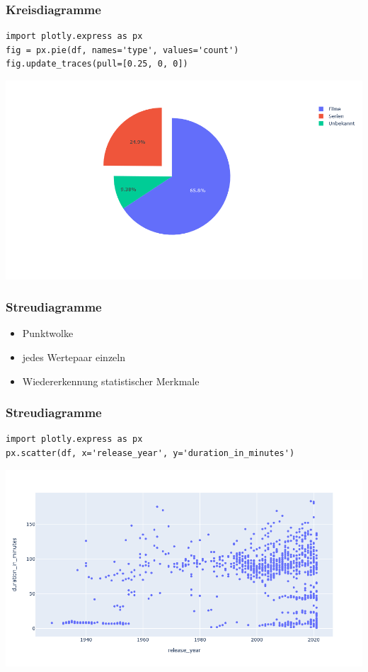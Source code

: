 \begin{frame}[fragile]
\frametitle{Kreisdiagramme}

\begin{verbatim}
import plotly.express as px
fig = px.pie(df, names='type', values='count')
fig.update_traces(pull=[0.25, 0, 0])
\end{verbatim}

\vspace{-\baselineskip}

\begin{center}
\includegraphics[width=0.80\linewidth]{fig5/pie4.png}
\end{center}
\end{frame}


\begin{frame}
\frametitle{Streudiagramme}

\begin{itemize}
	\item Punktwolke
	\item jedes Wertepaar einzeln
	\item Wiedererkennung statistischer Merkmale
\end{itemize}
\end{frame}


\begin{frame}[fragile]
\frametitle{Streudiagramme}

\begin{verbatim}
import plotly.express as px
px.scatter(df, x='release_year', y='duration_in_minutes')
\end{verbatim}

\vspace{-\baselineskip}

\begin{center}
\includegraphics[width=0.80\linewidth]{fig5/scatter1.png}
\end{center}
\end{frame}


